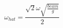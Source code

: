 \begin{equation} \label{eq:omega_hat_equation}
\omega_{hat} = \frac{\sqrt{2} \omega \sqrt{\frac{beam}{g}}}{2}
\end{equation}
